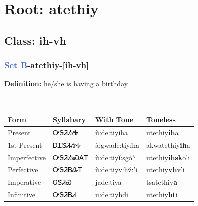 \needspace{4in}
\section*{Root: atethiy}
\nopagebreak
{}
\needspace{3in}
\subsection*{Class: ih-vh}
\nopagebreak
\needspace{2in}
\subsubsection*{\textcolor{RoyalBlue}{Set B}{-}\textbf{atethiy}{-}[ih-vh]}
\nopagebreak
\textbf{Definition: } he/she is having a birthday
\\[0.5em]
\begin{tabularx}{\textwidth}{l X X X}%
\toprule%
\textbf{Form}&\textbf{Syllabary}&\textbf{With Tone}&\textbf{Toneless}\\%
\midrule%
Present&ᎤᏕᏘᏱᎭ&ù:de:tiyíha&utethiy\textbf{ih}a\\%
1st Present&ᎠᏆᏕᏘᏱᎭ&à:gwade:tiyíha&akwatethiy\textbf{ih}a\\%
Imperfective&ᎤᏕᏘᏱᏍᎪᎢ&ù:de:tiyǐ:sgó’i&utethiy\textbf{ihsk}o'i\\%
Perfective&ᎤᏕᏘᏴᎲᎢ&ù:de:tiyv:hv̌:’i&utethiy\textbf{vh}v'i\\%
Imperative&ᏣᏕᏘᏯ&jade:tiya&tsatethiy\textbf{a}\\%
Infinitive&ᎤᏕᏘᏴᏗ&u:de:tiyhdi&utethiy\textbf{ht}i\\%
\bottomrule%
\end{tabularx}
\\[1em]